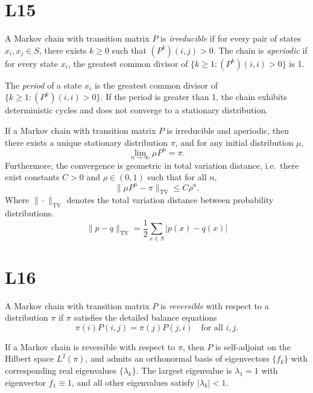 \documentclass[answers,12pt,addpoints]{exam}
\begin{document}
\section{L15}

\begin{definition}
A Markov chain with transition matrix $P$ is \emph{irreducible} if for every pair of states $x_i,x_j\in S$, there exists $k\ge 0$ such that $(P^k)(i,j) > 0$. The chain is \emph{aperiodic} if for every state $x_i$, the greatest common divisor of $\{k\ge 1 : (P^k)(i,i) > 0\}$ is 1.
\end{definition}

\begin{definition}
  [Period]
The \emph{period} of a state $x_i$ is the greatest common divisor of $\{k\ge 1 : (P^k)(i,i) > 0\}$. If the period is greater than 1, the chain exhibits deterministic cycles and does not converge to a stationary distribution.
\end{definition}

\begin{theorem}
If a Markov chain with transition matrix $P$ is irreducible and aperiodic, then there exists a unique stationary distribution $\pi$, and for any initial distribution $\mu$,
\[
\lim_{n\to\infty} \mu P^n = \pi.
\]
Furthermore, the convergence is geometric in total variation distance, i.e.\ there exist constants $C>0$ and $\rho\in(0,1)$ such that for all $n$,
\[
\|\mu P^n - \pi\|_{\mathrm{TV}} \le C \rho^n.
\]
Where $\|\cdot\|_{\mathrm{TV}}$ denotes the total variation distance between probability distributions.
\[
\|p-q\|_{\mathrm{TV}} = \frac{1}{2} \sum_{x\in S} |p(x) - q(x)|
\]
\end{theorem}

\section{L16}

\begin{definition}
A Markov chain with transition matrix $P$ is \emph{reversible} with respect to a distribution $\pi$ if $\pi$ satisfies the detailed balance equations
\[
\pi(i)P(i,j) = \pi(j)P(j,i)\quad \text{for all } i,j.
\]
\end{definition}

\begin{definition}
If a Markov chain is reversible with respect to $\pi$, then $P$ is self-adjoint on the Hilbert space $L^2(\pi)$, and admits an orthonormal basis of eigenvectors $\{f_k\}$ with corresponding real eigenvalues $\{\lambda_k\}$. The largest eigenvalue is $\lambda_1 = 1$ with eigenvector $f_1 \equiv 1$, and all other eigenvalues satisfy $|\lambda_k| < 1$.
\end{definition}
\end{document}
